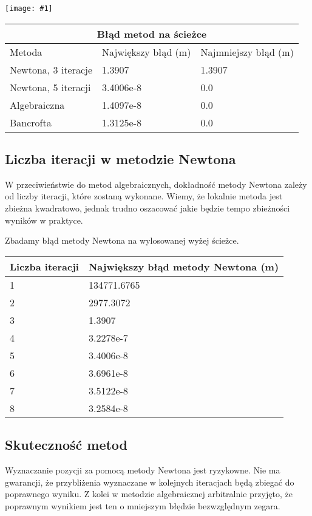 \documentclass{article}
\newcommand{\plot}[1] {
	\texttt{[image: \#1]}
}
\begin{document}
\plot{sciezkiteoretyczne.png}

\begin{tabular}{ |p{3.5cm}|p{3.5cm}|p{3.5cm}|  }
 \hline
 \multicolumn{3}{|c|}{Błąd metod na ścieżce} \\
 \hline
 	Metoda    & Największy błąd (m) & Najmniejszy błąd (m)\\
 \hline
 	Newtona, 3 iteracje   & 1.3907    & 1.3907\\
 \hline
 	Newtona, 5 iteracji &   3.4006e-8 & 0.0 \\
 \hline
 	Algebraiczna & 1.4097e-8 & 0.0\\
 \hline
 	Bancrofta & 1.3125e-8 & 0.0\\
 \hline
\end{tabular}


\subsection{Liczba iteracji w metodzie Newtona}
\par W przeciwieństwie do metod algebraicznych, dokładność metody Newtona zależy od liczby iteracji, które zostaną wykonane. Wiemy, że lokalnie metoda jest zbieżna kwadratowo, jednak trudno oszacować jakie będzie tempo zbieżności wyników w praktyce.

\par Zbadamy błąd metody Newtona na wylosowanej wyżej ścieżce.

\begin{tabular}{ |p{4cm}|p{6cm}|  }
 \hline
 	Liczba iteracji    & Największy błąd metody Newtona (m)\\
 \hline
  	1 & 134771.6765 \\
 \hline
 	2 & 2977.3072\\
 \hline
 	3 & 1.3907\\
 \hline
 	4 & 3.2278e-7\\
 \hline
 	5 & 3.4006e-8\\
 \hline
 	6 & 3.6961e-8\\
 \hline
 	7 & 3.5122e-8\\
 \hline
 	8 & 3.2584e-8\\
 \hline
\end{tabular}


\subsection{Skuteczność metod}
	Wyznaczanie pozycji za pomocą metody Newtona jest ryzykowne. Nie ma gwarancji, że przybliżenia wyznaczane w kolejnych iteracjach będą zbiegać do poprawnego wyniku. Z kolei w metodzie algebraicznej arbitralnie przyjęto, że poprawnym wynikiem jest ten o mniejszym błędzie bezwzględnym zegara.
\end{document}
